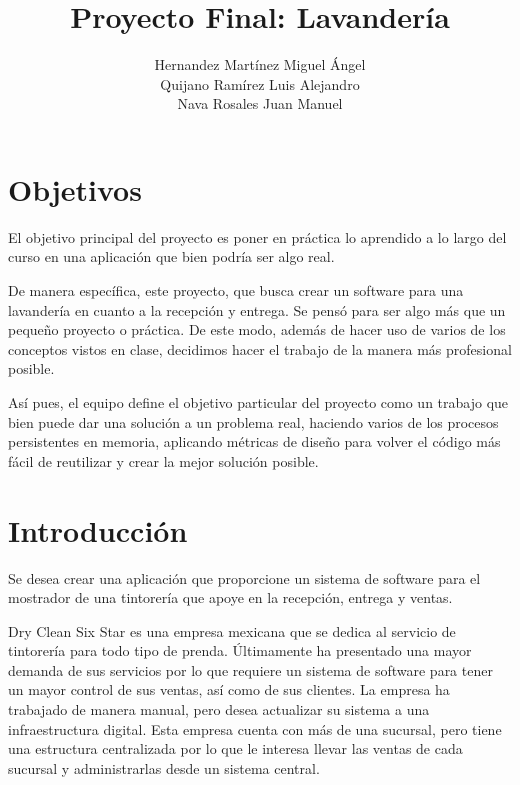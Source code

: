 \documentclass[12pt]{article}
\begin{document}
\title{Proyecto Final: Lavandería}
\author{Hernandez Martínez Miguel Ángel \\ Quijano Ramírez Luis Alejandro \\ Nava Rosales Juan Manuel}
\maketitle
\tableofcontents

\newpage

\section{Objetivos}
El objetivo principal del proyecto es poner en práctica lo aprendido a lo largo del curso en una aplicación que bien podría ser algo real.

\par De manera específica, este proyecto, que busca crear un software para una lavandería en cuanto a la recepción y entrega. Se pensó para ser algo más que un pequeño proyecto o práctica. De este modo, además de hacer uso de varios de los conceptos vistos en clase, decidimos hacer el trabajo de la manera más profesional posible. 

\par Así pues, el equipo define el objetivo particular del proyecto como un trabajo que bien puede dar una solución a un problema real, haciendo varios de los procesos persistentes en memoria, aplicando métricas de diseño para volver el código más fácil de reutilizar y crear la mejor solución posible.

\section{Introducción}
Se desea crear una aplicación que proporcione un sistema de software para el mostrador de una tintorería que apoye en la recepción, entrega y ventas. 

Dry Clean Six Star es una empresa mexicana que se dedica al servicio de tintorería para todo tipo de prenda. Últimamente ha presentado una mayor demanda de sus servicios por lo que requiere un sistema de software para tener un mayor control de sus ventas, así como de sus
clientes. La empresa ha trabajado de manera manual, pero desea actualizar su sistema a una infraestructura digital. Esta empresa cuenta con más de una sucursal, pero tiene una estructura centralizada por lo que le interesa llevar las ventas de cada sucursal y administrarlas desde un sistema central.
\end{document}

